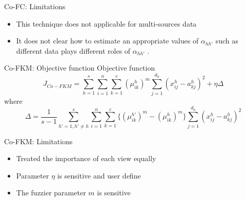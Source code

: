 \documentclass[compress,sky blue]{beamer}
\begin{document}

\begin{frame}{Co-FC: Limitations}
	\vspace{-0.3cm}	
    
\begin{itemize}
\item This technique does not applicable for multi-sources data 
\item It does not clear how to estimate an appropriate values of $\alpha_{hh'}$ such as different data plays different roles of $\alpha_{hh'}$ .
\end{itemize}


\end{frame}



\begin{frame}{Co-FKM: Objective function}
	\vspace{-0.3cm}	
Objective function \cite{Cleuziou2009CoFKM:Clustering}     
\begin{equation}
J_{Co-FKM}   = \sum_{h=1}^{s} \sum_{i=1}^{n}\sum_{k=1}^{c} \left(\mu_{ik}^{h} \right)^{m} \sum_{j=1}^{d_{h}} \left(x_{ij}^{h}-a_{kj}^{h}\right)^2+\eta\Delta
\label{Co-FKM} 
\end{equation}
where \begin{equation*}
\Delta=\frac{1}{s-1}\sum_{h'=1, h'\neq h}^{s}\sum_{i=1}^{n}\sum_{k=1}^{c}\bigg\{ \left(\mu_{ik}^{h'}\right)^{m}-\left(\mu_{ik}^{h}\right)^{m} \bigg\}\sum_{j=1}^{d_{h}} \left(x_{ij}^{h}-a_{kj}^{h}\right)^2
\label{Delta} 
\end{equation*} 

\end{frame}



\begin{frame}{Co-FKM: Limitations}
	\vspace{-0.3cm}	
    
\begin{itemize}
\item Treated the importance of each view equally
\item Parameter $\eta$ is sensitive and user define
\item The fuzzier parameter $m$ is sensitive
\end{itemize}

\end{frame}
\end{document}
